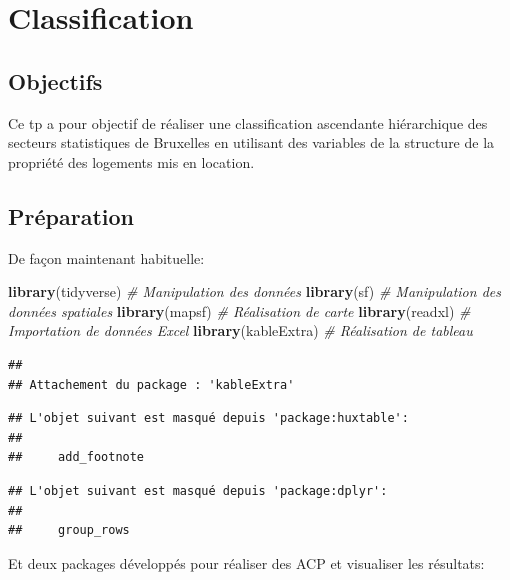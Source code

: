 \documentclass[
]{book}
\newenvironment{Shaded}{\begin{snugshade}}{\end{snugshade}}
\newcommand{\CommentTok}[1]{\textcolor[rgb]{0.56,0.35,0.01}{\textit{#1}}}
\newcommand{\FunctionTok}[1]{\textcolor[rgb]{0.13,0.29,0.53}{\textbf{#1}}}
\newcommand{\NormalTok}[1]{#1}
\begin{document}
\hypertarget{classification}{%
\chapter{Classification}\label{classification}}

\hypertarget{objectifs-1}{%
\section{Objectifs}\label{objectifs-1}}

Ce tp a pour objectif de réaliser une classification ascendante hiérarchique des secteurs statistiques de Bruxelles en utilisant des variables de la structure de la propriété des logements mis en location.

\hypertarget{pruxe9paration-1}{%
\section{Préparation}\label{pruxe9paration-1}}

De façon maintenant habituelle:

\begin{Shaded}
\begin{Highlighting}[]
\FunctionTok{library}\NormalTok{(tidyverse) }\CommentTok{\# Manipulation des données }
\FunctionTok{library}\NormalTok{(sf) }\CommentTok{\# Manipulation des données spatiales}
\FunctionTok{library}\NormalTok{(mapsf) }\CommentTok{\# Réalisation de carte}
\FunctionTok{library}\NormalTok{(readxl) }\CommentTok{\# Importation de données Excel}
\FunctionTok{library}\NormalTok{(kableExtra) }\CommentTok{\# Réalisation de tableau }
\end{Highlighting}
\end{Shaded}

\begin{verbatim}
## 
## Attachement du package : 'kableExtra'
\end{verbatim}

\begin{verbatim}
## L'objet suivant est masqué depuis 'package:huxtable':
## 
##     add_footnote
\end{verbatim}

\begin{verbatim}
## L'objet suivant est masqué depuis 'package:dplyr':
## 
##     group_rows
\end{verbatim}

Et deux packages développés pour réaliser des ACP et visualiser les résultats:
\end{document}

